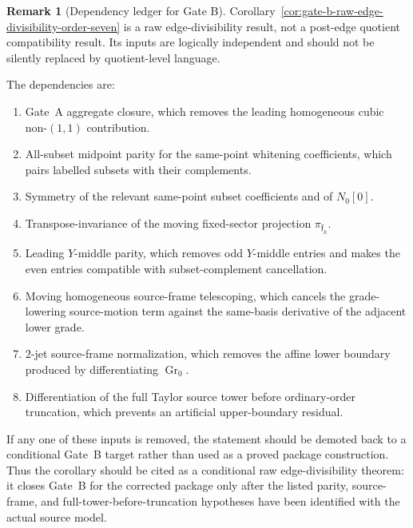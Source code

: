 \documentclass[11pt,a4paper]{amsart}
\theoremstyle{plain}
\theoremstyle{definition}
\newtheorem{remark}[theorem]{Remark}
\begin{document}
\begin{remark}[Dependency ledger for Gate B]
\label{rem:dependency-ledger-gate-b}
Corollary~\ref{cor:gate-b-raw-edge-divisibility-order-seven} is a raw
edge-divisibility result, not a post-edge quotient compatibility result.
Its inputs are logically independent and should not be silently replaced by
quotient-level language.

The dependencies are:
\begin{enumerate}
\item Gate~A aggregate closure, which removes the leading homogeneous
cubic non-\((1,1)\) contribution.
\item All-subset midpoint parity for the same-point whitening
coefficients, which pairs labelled subsets with their complements.
\item Symmetry of the relevant same-point subset coefficients and of
\(N_0[0]\).
\item Transpose-invariance of the moving fixed-sector projection
\(\pi_{\mathfrak f_h}\).
\item Leading \(Y\)-middle parity, which removes odd \(Y\)-middle entries
and makes the even entries compatible with subset-complement
cancellation.
\item Moving homogeneous source-frame telescoping, which cancels the
grade-lowering source-motion term against the same-basis derivative of
the adjacent lower grade.
\item \(2\)-jet source-frame normalization, which removes the affine
lower boundary produced by differentiating \(\operatorname{Gr}_0\).
\item Differentiation of the full Taylor source tower before
ordinary-order truncation, which prevents an artificial upper-boundary
residual.
\end{enumerate}

If any one of these inputs is removed, the statement should be demoted
back to a conditional Gate~B target rather than used as a proved package
construction.  Thus the corollary should be cited as a conditional raw
edge-divisibility theorem: it closes Gate~B for the corrected package only
after the listed parity, source-frame, and full-tower-before-truncation
hypotheses have been identified with the actual source model.
\end{remark}
\end{document}
